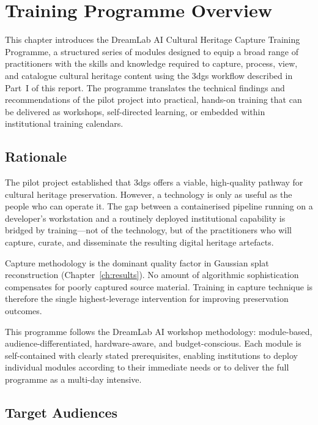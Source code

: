 \chapter{Training Programme Overview}
\label{ch:training-overview}

This chapter introduces the DreamLab AI Cultural Heritage Capture Training Programme, a structured series of modules designed to equip a broad range of practitioners with the skills and knowledge required to capture, process, view, and catalogue cultural heritage content using the \acrshort{3dgs} workflow described in Part~I of this report. The programme translates the technical findings and recommendations of the pilot project into practical, hands-on training that can be delivered as workshops, self-directed learning, or embedded within institutional training calendars.

\section{Rationale}
\label{sec:train-rationale}

The pilot project established that \acrshort{3dgs} offers a viable, high-quality pathway for cultural heritage preservation. However, a technology is only as useful as the people who can operate it. The gap between a containerised pipeline running on a developer's workstation and a routinely deployed institutional capability is bridged by training---not of the technology, but of the practitioners who will capture, curate, and disseminate the resulting digital heritage artefacts.

\begin{keyfinding}
Capture methodology is the dominant quality factor in Gaussian splat reconstruction (Chapter~\ref{ch:results}). No amount of algorithmic sophistication compensates for poorly captured source material. Training in capture technique is therefore the single highest-leverage intervention for improving preservation outcomes.
\end{keyfinding}

This programme follows the DreamLab AI workshop methodology: module-based, audience-differentiated, hardware-aware, and budget-conscious. Each module is self-contained with clearly stated prerequisites, enabling institutions to deploy individual modules according to their immediate needs or to deliver the full programme as a multi-day intensive.

\section{Target Audiences}
\label{sec:train-audiences}

